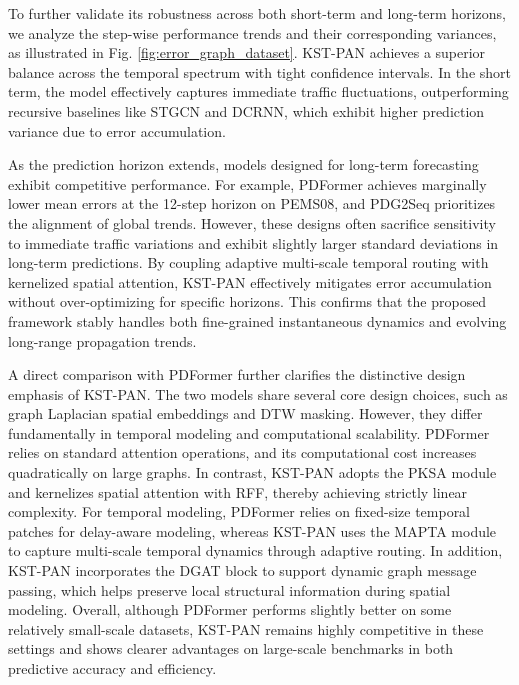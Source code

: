 \documentclass[5p,times,authoryear]{elsarticle}
\begin{document}
To further validate its robustness across both short-term and long-term horizons, we analyze the step-wise performance trends and their corresponding variances, as illustrated in Fig. \ref{fig:error_graph_dataset}. KST-PAN achieves a superior balance across the temporal spectrum with tight confidence intervals. In the short term, the model effectively captures immediate traffic fluctuations, outperforming recursive baselines like STGCN and DCRNN, which exhibit higher prediction variance due to error accumulation. 

As the prediction horizon extends, models designed for long-term forecasting exhibit competitive performance. For example, PDFormer achieves marginally lower mean errors at the 12-step horizon on PEMS08, and PDG2Seq prioritizes the alignment of global trends. However, these designs often sacrifice sensitivity to immediate traffic variations and exhibit slightly larger standard deviations in long-term predictions. By coupling adaptive multi-scale temporal routing with kernelized spatial attention, KST-PAN effectively mitigates error accumulation without over-optimizing for specific horizons. This confirms that the proposed framework stably handles both fine-grained instantaneous dynamics and evolving long-range propagation trends.

A direct comparison with PDFormer further clarifies the distinctive design emphasis of KST-PAN. The two models share several core design choices, such as graph Laplacian spatial embeddings and DTW masking. However, they differ fundamentally in temporal modeling and computational scalability. PDFormer relies on standard attention operations, and its computational cost increases quadratically on large graphs. In contrast, KST-PAN adopts the PKSA module and kernelizes spatial attention with RFF, thereby achieving strictly linear complexity. For temporal modeling, PDFormer relies on fixed-size temporal patches for delay-aware modeling, whereas KST-PAN uses the MAPTA module to capture multi-scale temporal dynamics through adaptive routing. In addition, KST-PAN incorporates the DGAT block to support dynamic graph message passing, which helps preserve local structural information during spatial modeling. Overall, although PDFormer performs slightly better on some relatively small-scale datasets, KST-PAN remains highly competitive in these settings and shows clearer advantages on large-scale benchmarks in both predictive accuracy and efficiency.
\end{document}
